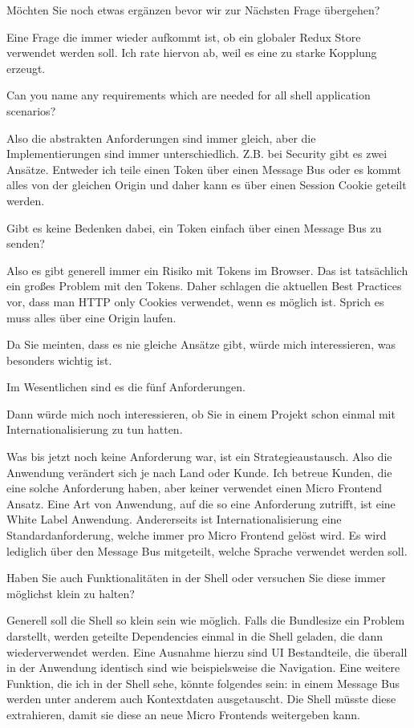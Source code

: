 \begin{description}
    \NicoVogel Möchten Sie noch etwas ergänzen bevor wir zur Nächsten Frage übergehen?

    \ManfredSteyer Eine Frage die immer wieder aufkommt ist, ob ein globaler Redux Store verwendet werden soll. Ich rate hiervon ab, weil es eine zu starke Kopplung erzeugt.


    \NicoVogel Can you name any requirements which are needed for all shell application scenarios?

    \ManfredSteyer Also die abstrakten Anforderungen sind immer gleich, aber die Implementierungen sind immer unterschiedlich. Z.B. bei Security gibt es zwei Ansätze. Entweder ich teile einen Token über einen Message Bus oder es kommt alles von der gleichen Origin und daher kann es über einen Session Cookie geteilt werden.


    \NicoVogel Gibt es keine Bedenken dabei, ein Token einfach über einen Message Bus zu senden?


    \ManfredSteyer Also es gibt generell immer ein Risiko mit Tokens im Browser. Das ist tatsächlich ein großes Problem mit den Tokens. Daher schlagen die aktuellen Best Practices vor, dass man HTTP only Cookies verwendet, wenn es möglich ist. Sprich es muss alles über eine Origin laufen.


    \NicoVogel Da Sie meinten, dass es nie gleiche Ansätze gibt, würde mich interessieren, was besonders wichtig ist.


    \ManfredSteyer Im Wesentlichen sind es die fünf Anforderungen.


    \NicoVogel Dann würde mich noch interessieren, ob Sie in einem Projekt schon einmal mit Internationalisierung zu tun hatten.


    \ManfredSteyer Was bis jetzt noch keine Anforderung war, ist ein Strategieaustausch. Also die Anwendung verändert sich je nach Land oder Kunde. Ich betreue Kunden, die eine solche Anforderung haben, aber keiner verwendet einen Micro Frontend Ansatz. Eine Art von Anwendung, auf die so eine Anforderung zutrifft, ist eine White Label Anwendung.
    Andererseits ist Internationalisierung eine Standardanforderung, welche immer pro Micro Frontend gelöst wird. Es wird lediglich über den Message Bus mitgeteilt, welche Sprache verwendet werden soll.


    \NicoVogel Haben Sie auch Funktionalitäten in der Shell oder versuchen Sie diese immer möglichst klein zu halten?


    \ManfredSteyer Generell soll die Shell so klein sein wie möglich. Falls die Bundlesize ein Problem darstellt, werden geteilte Dependencies einmal in die Shell geladen, die dann wiederverwendet werden. Eine Ausnahme hierzu sind UI Bestandteile, die überall in der Anwendung identisch sind wie beispielsweise die Navigation. Eine weitere Funktion, die ich in der Shell sehe, könnte folgendes sein: in einem Message Bus werden unter anderem auch Kontextdaten ausgetauscht. Die Shell müsste diese extrahieren, damit sie diese an neue Micro Frontends weitergeben kann.



\end{description}
